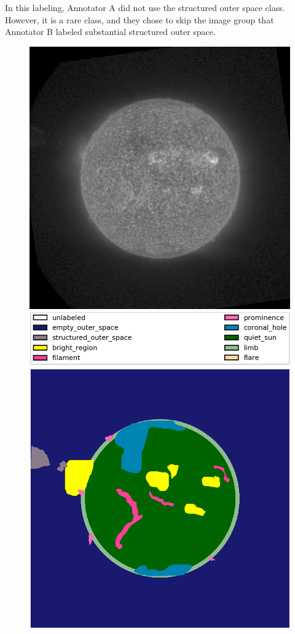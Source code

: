\documentclass[twoside]{report}
\begin{document}
In this labeling, Annotator A did not use the structured outer space class. However, it is a rare class, and they chose to skip the image group that Annotator B labeled substantial structured outer space. 
\begin{figure}[ht]
  \begin{center}
    \includegraphics[scale=0.35]{g20170619060208}
    \includegraphics[scale=0.1]{g20170619060208-0b}

\end{center}
\end{figure}
\end{document}
